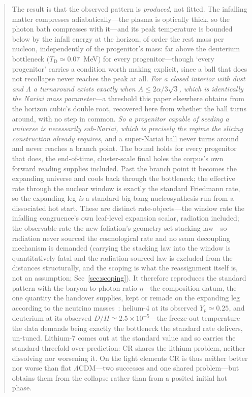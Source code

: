 \documentclass[11pt,a4paper]{article}
\theoremstyle{plain}
\theoremstyle{definition}
\theoremstyle{remark}
\newcommand{\TD}{T_{\mathrm{D}}}
\begin{document}
\begin{abstract}
The result is that the observed pattern is \emph{produced}, not fitted. The infalling
matter compresses adiabatically---the plasma is optically thick, so the photon bath
compresses with it---and its peak temperature is bounded below by the infall energy at the
horizon, of order the rest mass per nucleon, independently of the progenitor's mass: far
above the deuterium bottleneck ($\TD\simeq0.07$~MeV) for every progenitor---though `every progenitor' carries a condition worth making explicit, since a ball that does not recollapse never reaches the peak at all. \emph{For a closed interior with dust and $\Lambda$ a turnaround exists exactly when $A\le2\alpha/3\sqrt3$, which is identically the Nariai mass parameter}---a threshold this paper elsewhere obtains from the horizon cubic's double root, recovered here from whether the ball turns around, with no step in common. \emph{So a progenitor capable of seeding a universe is necessarily sub-Nariai, which is precisely the regime the slicing construction already requires}, and a super-Nariai ball never turns around and never reaches a branch point. The bound holds for every
progenitor that does, the end-of-time, cluster-scale final holes the corpus's own forward reading supplies
included. Past the branch point it becomes the expanding universe and cools back through the
bottleneck; the effective rate through the nuclear window is exactly the standard Friedmann rate, so the expanding leg \emph{is} a standard big-bang nucleosynthesis run from a dissociated hot start. These are distinct rate-objects---the window rate the
infalling congruence's own leaf-level expansion scalar, radiation included; the observable
rate the new foliation's geometry-set stacking law---so radiation never sourced the
cosmological rate and no seam decoupling mechanism is demanded (carrying the stacking law into the window is
quantitatively fatal and the radiation-sourced law is excluded from the distances structurally, and the scoping is
what the reassignment itself is, not an assumption; Sec~\ref{sec:scoping}). It therefore reproduces the standard pattern with the baryon-to-photon ratio $\eta$---the composition datum, the one quantity the handover supplies, kept or remade on the expanding leg according to the neutrino masses~\cite{JanzenCRcosmology}: helium-4 at its observed
$Y_p\simeq0.25$, and deuterium at its observed $D/H\simeq2.5\times10^{-5}$---the freeze-out
temperature the data demands being exactly the bottleneck the standard rate delivers, un-tuned.
Lithium-7 comes out at the standard value and so carries the standard threefold
over-prediction: CR shares the lithium problem, neither dissolving nor worsening it.
On the light elements CR is thus neither better nor worse than flat $\Lambda$CDM---two
successes and one shared problem---but obtains them from the collapse rather than from a
posited initial hot phase.


\end{abstract}
\end{document}

